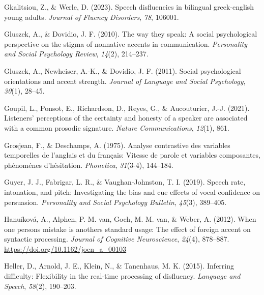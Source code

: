\documentclass[
  man,floatsintext]{apa7}
\newlength{\cslhangindent}
\newlength{\cslentryspacingunit} %
\newenvironment{CSLReferences}[2] %
 {%
  \setlength{\parindent}{0pt}
  \ifodd #1
  \let\oldpar\par
  \def\par{\hangindent=\cslhangindent\oldpar}
  \fi
  \setlength{\parskip}{#2\cslentryspacingunit}
 }%
 {}
\begin{document}
\begin{CSLReferences}{1}{0}
\leavevmode{}%
Gkalitsiou, Z., \& Werle, D. (2023). Speech disfluencies in bilingual greek-english young adults. \emph{Journal of Fluency Disorders}, \emph{78}, 106001.

\leavevmode{}%
Gluszek, A., \& Dovidio, J. F. (2010). The way they speak: A social psychological perspective on the stigma of nonnative accents in communication. \emph{Personality and Social Psychology Review}, \emph{14}(2), 214--237.

\leavevmode{}%
Gluszek, A., Newheiser, A.-K., \& Dovidio, J. F. (2011). Social psychological orientations and accent strength. \emph{Journal of Language and Social Psychology}, \emph{30}(1), 28--45.

\leavevmode{}%
Goupil, L., Ponsot, E., Richardson, D., Reyes, G., \& Aucouturier, J.-J. (2021). Listeners' perceptions of the certainty and honesty of a speaker are associated with a common prosodic signature. \emph{Nature Communications}, \emph{12}(1), 861.

\leavevmode{}%
Grosjean, F., \& Deschamps, A. (1975). Analyse contrastive des variables temporelles de l'anglais et du fran{ç}ais: Vitesse de parole et variables composantes, ph{é}nom{é}nes d'h{é}sitation. \emph{Phonetica}, \emph{31}(3-4), 144--184.

\leavevmode{}%
Guyer, J. J., Fabrigar, L. R., \& Vaughan-Johnston, T. I. (2019). Speech rate, intonation, and pitch: Investigating the bias and cue effects of vocal confidence on persuasion. \emph{Personality and Social Psychology Bulletin}, \emph{45}(3), 389--405.

\leavevmode{}%
Hanuíková, A., Alphen, P. M. van, Goch, M. M. van, \& Weber, A. (2012). When one person{\textquotesingle}s mistake is another{\textquotesingle}s standard usage: The effect of foreign accent on syntactic processing. \emph{Journal of Cognitive Neuroscience}, \emph{24}(4), 878--887. \url{https://doi.org/10.1162/jocn_a_00103}

\leavevmode{}%
Heller, D., Arnold, J. E., Klein, N., \& Tanenhaus, M. K. (2015). Inferring difficulty: Flexibility in the real-time processing of disfluency. \emph{Language and Speech}, \emph{58}(2), 190--203.


\end{CSLReferences}
\end{document}
